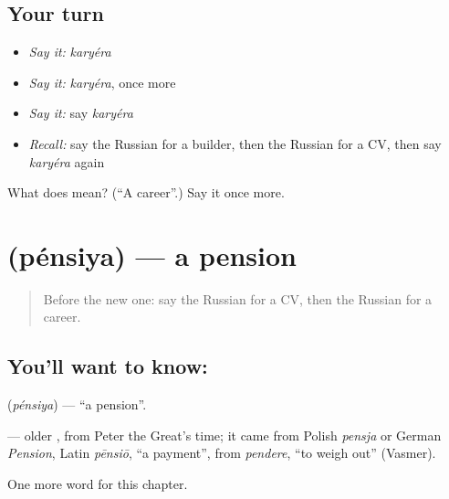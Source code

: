 \subsection*{Your turn}
\begin{itemize}
\raggedright
  \item \emph{Say it:} \emph{karyéra}
  \item \emph{Say it:} \emph{karyéra}, once more
  \item \emph{Say it:} say \emph{karyéra}
  \item \emph{Recall:} say the Russian for a builder, then the Russian for a CV, then say \emph{karyéra} again
\end{itemize}

\begin{tcolorbox}[breakable,colback=teal!4,colframe=teal!35!black,title={Before you move on}]
What does  mean? (\textquotedblleft{}A career\textquotedblright{}.) Say it once more.
\end{tcolorbox}
\section[\texorpdfstring{\ru{пенсия} (pénsiya)}{пенсия (pénsiya)}]{ (pénsiya) — a pension}

\label{lesson:RU-C172-pensiya}



\begin{quote}
Before the new one: say the Russian for a CV, then the Russian for a career.
\end{quote}

\subsection*{You'll want to know: }
\textbf{} (\emph{pénsiya}) — \textquotedblleft{}a pension\textquotedblright{}.

\begin{cousinweb}
\textbf{} — older \emph{}, from Peter the Great's time; it came from Polish \emph{pensja} or German \emph{Pension}, Latin \emph{pēnsiō}, \textquotedblleft{}a payment\textquotedblright{}, from \emph{pendere}, \textquotedblleft{}to weigh out\textquotedblright{} (Vasmer).
\end{cousinweb}

\begin{grammarlens}[title={What you've built}]
One more word for this chapter.
\end{grammarlens}

